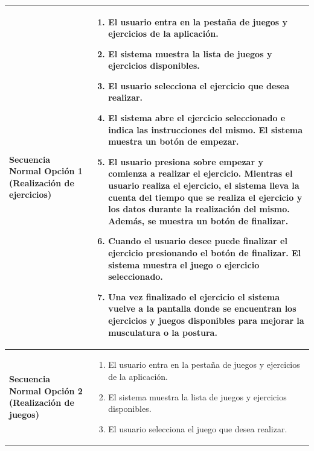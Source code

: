 \begin{table}[h!]
\centering
\begin{tabular}{ |m{4cm}|m{11cm}|  } 
\hline 
\cellcolor[HTML]{EFEFEF}\textbf{Secuencia \newline Normal Opción 1 \newline(Realización de ejercicios)}                &                 
        \begin{enumerate}
			\def\labelenumi{\arabic{enumi}.}
			\tightlist
			\item El usuario entra en la pestaña de juegos y ejercicios
                de la aplicación.
                \item El sistema muestra la lista de juegos y ejercicios disponibles.
                \item El usuario selecciona el ejercicio que desea realizar.
                \item El sistema abre el ejercicio seleccionado e indica las instrucciones del mismo. El sistema muestra un botón de empezar.
                \item El usuario presiona sobre empezar y comienza a realizar el ejercicio. Mientras el usuario realiza el ejercicio, el sistema lleva la cuenta del tiempo que se realiza el ejercicio y los datos durante la realización del mismo. Además, se muestra un botón de finalizar.
			\item Cuando el usuario desee puede finalizar el ejercicio        presionando el botón de finalizar. El sistema muestra el          juego o ejercicio seleccionado. 
                \item Una vez finalizado el ejercicio el sistema vuelve a la pantalla donde se encuentran los ejercicios y juegos disponibles para mejorar la musculatura o la postura. 
		\end{enumerate}\\
\hline
\cellcolor[HTML]{EFEFEF}\textbf{Secuencia \newline Normal Opción 2 \newline(Realización de juegos)}                &                 
        \begin{enumerate}
			\def\labelenumi{\arabic{enumi}.}
			\tightlist
			\item El usuario entra en la pestaña de juegos y ejercicios       de la aplicación.
                \item El sistema muestra la lista de juegos y ejercicios disponibles.
                \item El usuario selecciona el juego que desea realizar.

\end{enumerate}
\end{tabular}
\end{table}
